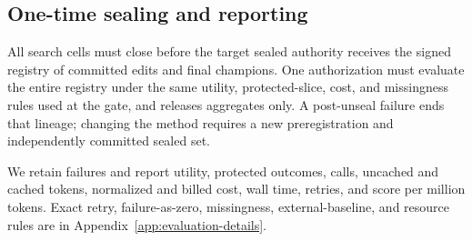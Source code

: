 \subsection{One-time sealing and reporting}

All search cells must close before the target sealed authority receives the
signed registry of committed edits and final champions.  One authorization must evaluate the entire
registry under the same utility, protected-slice, cost, and missingness rules
used at the gate, and releases aggregates only.  A post-unseal failure ends that
lineage; changing the method requires a new preregistration and independently
committed sealed set.

We retain failures and report utility, protected outcomes, calls, uncached and
cached tokens, normalized and billed cost, wall time, retries, and score per
million tokens.  Exact retry, failure-as-zero, missingness, external-baseline,
and resource rules are in Appendix~\ref{app:evaluation-details}.
